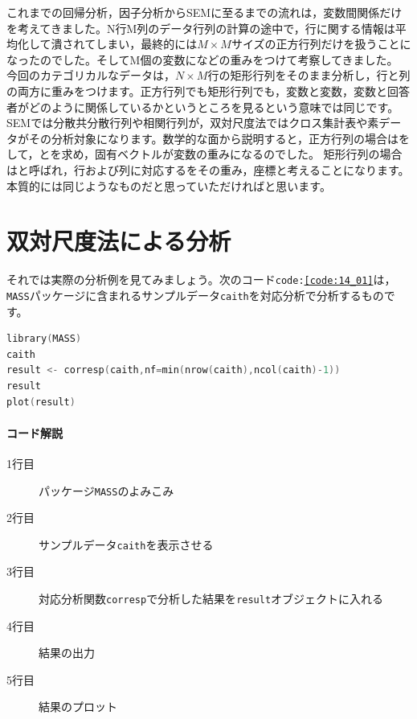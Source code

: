 \documentclass{ltjsbook}
\begin{document}
これまでの回帰分析，因子分析からSEMに至るまでの流れは，変数間関係だけを考えてきました。N行M列のデータ行列の計算の途中で，行に関する情報は平均化して潰されてしまい，最終的には$M \times M$サイズの正方行列だけを扱うことになったのでした。そしてM個の変数になどの重みをつけて考察してきました。
今回のカテゴリカルなデータは，$N\times M$行の矩形行列をそのまま分析し，行と列の両方に重みをつけます。正方行列でも矩形行列でも，変数と変数，変数と回答者がどのように関係しているかというところを見るという意味では同じです。SEMでは分散共分散行列や相関行列が，双対尺度法ではクロス集計表や素データがその分析対象になります。数学的な面から説明すると，正方行列の場合はをして，とを求め，固有ベクトルが変数の重みになるのでした。
矩形行列の場合はと呼ばれ，行および列に対応するをその重み，座標と考えることになります。本質的には同じようなものだと思っていただければと思います。

\section{双対尺度法による分析}
それでは実際の分析例を見てみましょう。次のコード\texttt{code:\ref{code:14_01}}は，\texttt{MASS}パッケージに含まれるサンプルデータ\texttt{caith}を対応分析で分析するものです。

\begin{lstlisting}[language=c++,label={code:14_01},caption={双対尺度法による分析}]
library(MASS)
caith
result <- corresp(caith,nf=min(nrow(caith),ncol(caith)-1))
result
plot(result)
\end{lstlisting}

\paragraph{コード解説}
\begin{description}
	\item[1行目] パッケージ\texttt{MASS}のよみこみ
	\item[2行目] サンプルデータ\texttt{caith}を表示させる
	\item[3行目] 対応分析関数\texttt{corresp}で分析した結果を\texttt{result}オブジェクトに入れる
	\item[4行目] 結果の出力
	\item[5行目] 結果のプロット
\end{description}
\end{document}
